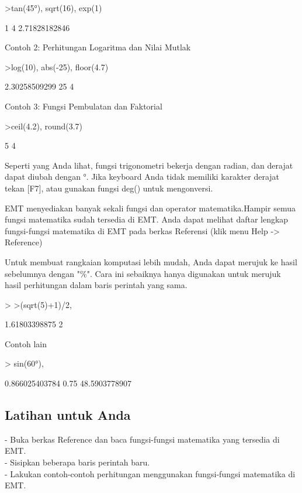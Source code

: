 \documentclass{article}
\newenvironment{eulernotebook}{\par}{\par}
\newcommand{\eulersubheading}[1]{\subsection{#1}}
\newenvironment{eulercomment}{\par\medskip}{\par\medskip}
\begin{document}
\begin{eulernotebook}
\begin{eulerprompt}
>tan(45°), sqrt(16), exp(1)
\end{eulerprompt}
\begin{euleroutput}
  1
  4
  2.71828182846
\end{euleroutput}
\begin{eulercomment}
Contoh 2: Perhitungan Logaritma dan Nilai Mutlak
\end{eulercomment}
\begin{eulerprompt}
>log(10), abs(-25), floor(4.7)
\end{eulerprompt}
\begin{euleroutput}
  2.30258509299
  25
  4
\end{euleroutput}
\begin{eulercomment}
Contoh 3: Fungsi Pembulatan dan Faktorial
\end{eulercomment}
\begin{eulerprompt}
>ceil(4.2), round(3.7)
\end{eulerprompt}
\begin{euleroutput}
  5
  4
\end{euleroutput}
\begin{eulercomment}
Seperti yang Anda lihat, fungsi trigonometri bekerja dengan radian,
dan derajat dapat diubah dengan °. Jika keyboard Anda tidak memiliki
karakter derajat tekan [F7], atau gunakan fungsi deg() untuk
mengonversi.

EMT menyediakan banyak sekali fungsi dan operator matematika.Hampir
semua fungsi matematika sudah tersedia di EMT. Anda dapat melihat
daftar lengkap fungsi-fungsi matematika di EMT pada berkas Referensi
(klik menu Help -\textgreater{} Reference)

Untuk membuat rangkaian komputasi lebih mudah, Anda dapat merujuk ke
hasil sebelumnya dengan "\%". Cara ini sebaiknya hanya digunakan untuk
merujuk hasil perhitungan dalam baris perintah yang sama.
\end{eulercomment}
\begin{eulerprompt}
>  
>(sqrt(5)+1)/2, %
\end{eulerprompt}
\begin{euleroutput}
  1.61803398875
  2
\end{euleroutput}
\begin{eulercomment}
Contoh lain
\end{eulercomment}
\begin{eulerprompt}
> sin(60°), %
\end{eulerprompt}
\begin{euleroutput}
  0.866025403784
  0.75
  48.5903778907
\end{euleroutput}
\eulersubheading{Latihan untuk Anda}
\begin{eulercomment}
- Buka berkas Reference dan baca fungsi-fungsi matematika yang
tersedia di EMT.\\
- Sisipkan beberapa baris perintah baru.\\
- Lakukan contoh-contoh perhitungan menggunakan fungsi-fungsi
matematika di EMT.


\end{eulercomment}
\end{eulernotebook}
\end{document}
